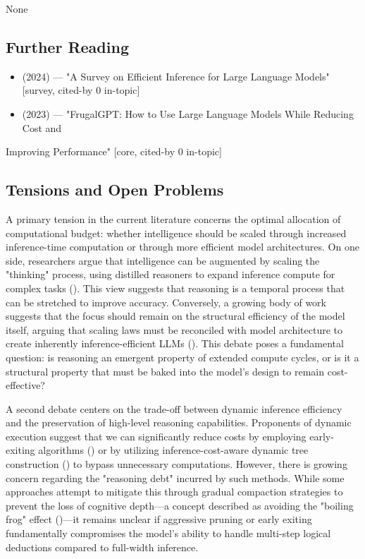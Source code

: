 \documentclass[11pt]{article}
\begin{document}
None

\subsection{Further Reading}

\begin{itemize}
  \item \citep{2404.14294} (2024) — "A Survey on Efficient Inference for Large Language Models" [survey, cited-by 0 in-topic]
  \item \citep{2305.05176} (2023) — "FrugalGPT: How to Use Large Language Models While Reducing Cost and
\end{itemize}
  Improving Performance" [core, cited-by 0 in-topic]

\subsection{Tensions and Open Problems}

A primary tension in the current literature concerns the optimal allocation of computational budget: whether intelligence should be scaled through increased inference-time computation or through more efficient model architectures. On one side, researchers argue that intelligence can be augmented by scaling the "thinking" process, using distilled reasoners to expand inference compute for complex tasks (\citep{2502.20339}). This view suggests that reasoning is a temporal process that can be stretched to improve accuracy. Conversely, a growing body of work suggests that the focus should remain on the structural efficiency of the model itself, arguing that scaling laws must be reconciled with model architecture to create inherently inference-efficient LLMs (\citep{2510.18245}). This debate poses a fundamental question: is reasoning an emergent property of extended compute cycles, or is it a structural property that must be baked into the model's design to remain cost-effective?

A second debate centers on the trade-off between dynamic inference efficiency and the preservation of high-level reasoning capabilities. Proponents of dynamic execution suggest that we can significantly reduce costs by employing early-exiting algorithms (\citep{2509.05915}) or by utilizing inference-cost-aware dynamic tree construction (\citep{2510.26577}) to bypass unnecessary computations. However, there is growing concern regarding the "reasoning debt" incurred by such methods. While some approaches attempt to mitigate this through gradual compaction strategies to prevent the loss of cognitive depth—a concept described as avoiding the "boiling frog" effect (\citep{2602.04919})—it remains unclear if aggressive pruning or early exiting fundamentally compromises the model's ability to handle multi-step logical deductions compared to full-width inference.
\end{document}
